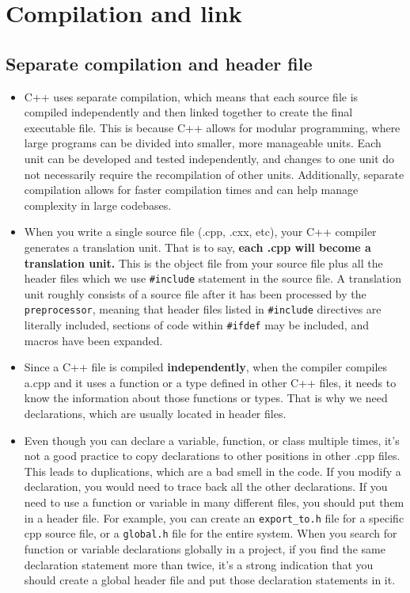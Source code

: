 \documentclass[a4paper,11pt,twoside]{book}
\begin{document}
\section{Compilation and link}

\subsection{Separate compilation and header file}
\begin{itemize}
	\item C++ uses separate compilation, which means that each source file is compiled independently and then linked together to create the final executable file. This is because C++ allows for modular programming, where large programs can be divided into smaller, more manageable units. Each unit can be developed and tested independently, and changes to one unit do not necessarily require the recompilation of other units. Additionally, separate compilation allows for faster compilation times and can help manage complexity in large codebases.
	
	\item When you write a single source file (.cpp, .cxx, etc), your C++ compiler generates a translation unit. That is to say, \textbf{each .cpp will become a translation unit.} This is the object file from your source file plus all the header files which we use \texttt{\#include} statement in the source file.  A translation unit roughly consists of a source file after it has been processed by the \texttt{preprocessor}, meaning that header files listed in \texttt{\#include} directives are literally included, sections of code within \texttt{\#ifdef} may be included, and macros have been expanded.
	
	\item Since a C++ file is compiled \textbf{independently}, when the compiler compiles a.cpp and it uses a function or a type defined in other C++ files, it needs to know the information about those functions or types. That is why we need declarations, which are usually located in header files.
	
	\item Even though you can declare a variable, function, or class multiple times, it's not a good practice to copy declarations to other positions in other .cpp files. This leads to duplications, which are a bad smell in the code. If you modify a declaration, you would need to trace back all the other declarations. If you need to use a function or variable in many different files, you should put them in a header file. For example, you can create an \texttt{export\_to.h} file for a specific cpp source file, or a \texttt{global.h} file for the entire system. When you search for function or variable declarations globally in a project, if you find the same declaration statement more than twice, it's a strong indication that you should create a global header file and put those declaration statements in it.


\end{itemize}
\end{document}
